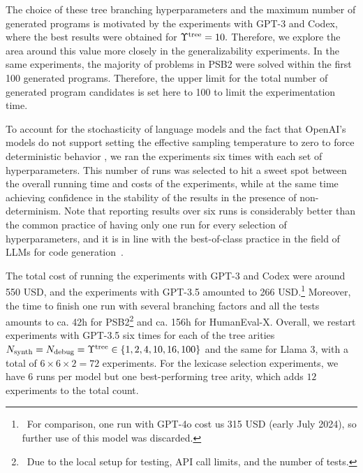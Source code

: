The choice of these tree branching hyperparameters and the maximum number of generated programs is motivated by the experiments with GPT-3 and Codex, where the best results were obtained for $\Upsilon^\text{tree}{}=10.$ 
Therefore, we explore the area around this value more closely in the generalizability experiments.
In the same experiments, the majority of problems in PSB2 were solved within the first 100 generated programs.
Therefore, the upper limit for the total number of generated program candidates is set here to 100 to limit the experimentation time.

To account for the stochasticity of language models and the fact that OpenAI's models do not support setting the effective sampling temperature to zero to force deterministic behavior \cite{ObservingDiscrepancyCompletions2023}, we ran the experiments six times with each set of hyperparameters.
This number of runs was selected to hit a sweet spot between the overall running time and costs of the experiments, while at the same time achieving confidence in the stability of the results in the presence of non-determinism. 
Note that reporting results over six runs is considerably better than the common practice of having only one run for every selection of hyperparameters, and it is in line with the best-of-class practice in the field of LLMs for code generation~\cite{ouyangLLMBoxChocolates2023}.

The total cost of running the experiments with GPT-3 and Codex were around 550 USD, and the experiments with GPT-3.5 amounted to 266 USD.\footnote{~For comparison, one run with GPT-4o cost us 315 USD (early July 2024), so further use of this model was discarded.}
Moreover, the time to finish one run with several branching factors and all the tests amounts to ca. 42h for PSB2\footnote{~Due to the local setup for testing, API call limits, and the number of tests.} and ca. 156h for HumanEval-X.
Overall, we restart experiments with GPT-3.5 six times for each of the tree arities $ N_{\text{synth}} = N_{\text{debug}} = \Upsilon^\text{tree} \in \{1,2, 4,10,16,100\}$ and the same for Llama 3, with a total of $6 \times 6 \times 2 = 72$ experiments. 
For the lexicase selection experiments, we have 6 runs per model but one best-performing tree arity, which adds $12$ experiments to the total count.

